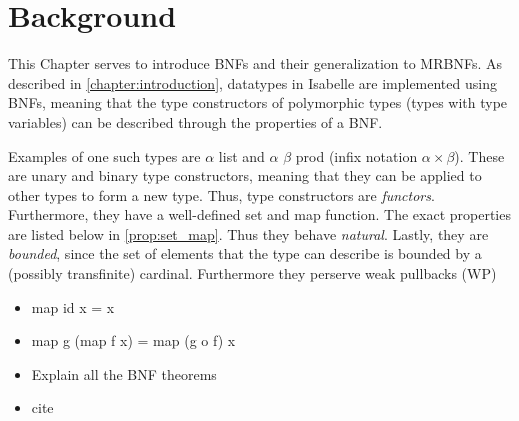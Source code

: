 
\chapter{Background}
\label{chapter:background}

  This Chapter serves to introduce \acp{BNF} and their generalization to \acp{MRBNF}. 
  As described in \autoref{chapter:introduction}, datatypes in Isabelle are implemented using \acp{BNF}, meaning that the type constructors of polymorphic types (types with type variables) can be described through the properties of a \ac{BNF}.

  Examples of one such types are \textsf{$\alpha$ list} and \textsf{$\alpha$ $\beta$ prod} (infix notation \textsf{$\alpha \times \beta$}). These are unary and binary type constructors, meaning that they can be applied to other types to form a new type. Thus, type constructors are \textit{functors}. Furthermore, they have a well-defined set and map function. The exact properties are listed below in \autoref{prop:set_map}.
  Thus they behave \textit{natural}. Lastly, they are \textit{bounded}, since the set of elements that the type can describe is bounded by a (possibly transfinite) cardinal.
  Furthermore they perserve weak pullbacks (WP) %

  \begin{itemize}
    \item map id x = x
    \item map g (map f x) = map (g o f) x
  \end{itemize}
  \label{prop:set_map}

  \begin{itemize}
    \item Explain all the BNF theorems
    \item cite \cite{blanchette2019bindings}
  \end{itemize}

